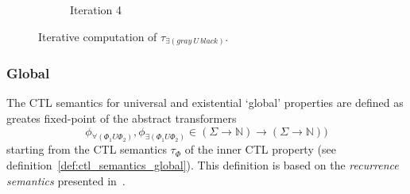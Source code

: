 \documentclass[11pt,a4paper,titlepage]{article}
\begin{document}
\begin{figure}
\begin{subfigure}[b]{0.32\textwidth}
{
        }
        \caption{Iteration 4}
    \end{subfigure}
    \caption{Iterative computation of $\tau_{\exists(gray \ U \ black)}$.} 
    \label{fig:ctl_semantics_existential_until}
\end{figure}


\subsubsection*{Global}

The CTL semantics for universal and existential `global' properties are defined as greates fixed-point of the abstract transformers
\[
\phi_{\forall(\Phi_1 U \Phi_2)}, \phi_{\exists(\Phi_1 U \Phi_2)} 
\in (\Sigma \rightarrow \mathbb{N}) \rightarrow (\Sigma \rightarrow \mathbb{N}))
\]
starting from the CTL semantics $\tau_\Phi$ of the inner CTL property (see definition~\ref{def:ctl_semantics_global}).
This definition is based on the \textit{recurrence semantics} presented in~\cite{UrbanM-VMCAI15}.
\end{document}
